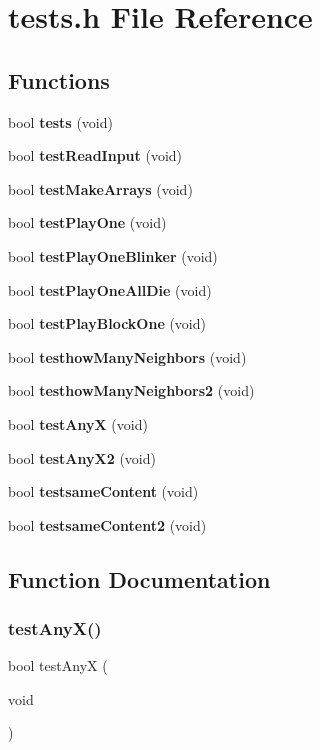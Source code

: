 \section{tests.\+h File Reference}
\label{tests_8h}
\subsection*{Functions}
\begin{DoxyCompactItemize}
\item 
bool \textbf{ tests} (void)
\item 
bool \textbf{ test\+Read\+Input} (void)
\item 
bool \textbf{ test\+Make\+Arrays} (void)
\item 
bool \textbf{ test\+Play\+One} (void)
\item 
bool \textbf{ test\+Play\+One\+Blinker} (void)
\item 
bool \textbf{ test\+Play\+One\+All\+Die} (void)
\item 
bool \textbf{ test\+Play\+Block\+One} (void)
\item 
bool \textbf{ testhow\+Many\+Neighbors} (void)
\item 
bool \textbf{ testhow\+Many\+Neighbors2} (void)
\item 
bool \textbf{ test\+AnyX} (void)
\item 
bool \textbf{ test\+Any\+X2} (void)
\item 
bool \textbf{ testsame\+Content} (void)
\item 
bool \textbf{ testsame\+Content2} (void)
\end{DoxyCompactItemize}


\subsection{Function Documentation}
\mbox{\label{tests_8h_a9136792bde961164c06bcdde7ab1d5f5}} 
\subsubsection{test\+Any\+X()}
{\footnotesize\ttfamily bool test\+AnyX (\begin{DoxyParamCaption}\item[{void}]{ }\end{DoxyParamCaption})}




